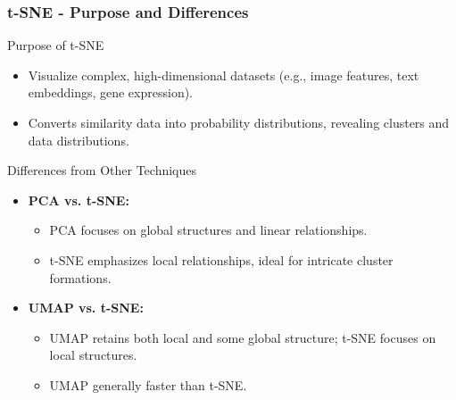 \documentclass[aspectratio=169]{beamer}
\begin{document}
\begin{frame}[fragile]
    \frametitle{t-SNE - Purpose and Differences}
    \begin{block}{Purpose of t-SNE}
        \begin{itemize}
            \item Visualize complex, high-dimensional datasets (e.g., image features, text embeddings, gene expression).
            \item Converts similarity data into probability distributions, revealing clusters and data distributions.
        \end{itemize}
    \end{block}

    \begin{block}{Differences from Other Techniques}
        \begin{itemize}
            \item \textbf{PCA vs. t-SNE:}
                \begin{itemize}
                    \item PCA focuses on global structures and linear relationships.
                    \item t-SNE emphasizes local relationships, ideal for intricate cluster formations.
                \end{itemize}
            \item \textbf{UMAP vs. t-SNE:}
                \begin{itemize}
                    \item UMAP retains both local and some global structure; t-SNE focuses on local structures.
                    \item UMAP generally faster than t-SNE.
                \end{itemize}
        \end{itemize}
    \end{block}
\end{frame}
\end{document}
